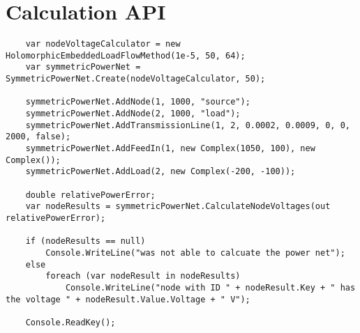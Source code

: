 \chapter{Calculation API}
\label{chap:calculation_api}

\begin{lstlisting}
	var nodeVoltageCalculator = new HolomorphicEmbeddedLoadFlowMethod(1e-5, 50, 64);
	var symmetricPowerNet = SymmetricPowerNet.Create(nodeVoltageCalculator, 50);

	symmetricPowerNet.AddNode(1, 1000, "source");
	symmetricPowerNet.AddNode(2, 1000, "load");
	symmetricPowerNet.AddTransmissionLine(1, 2, 0.0002, 0.0009, 0, 0, 2000, false);
	symmetricPowerNet.AddFeedIn(1, new Complex(1050, 100), new Complex());
	symmetricPowerNet.AddLoad(2, new Complex(-200, -100));

	double relativePowerError;
	var nodeResults = symmetricPowerNet.CalculateNodeVoltages(out relativePowerError);

	if (nodeResults == null)
		Console.WriteLine("was not able to calcuate the power net");
	else
		foreach (var nodeResult in nodeResults)
			Console.WriteLine("node with ID " + nodeResult.Key + " has the voltage " + nodeResult.Value.Voltage + " V");

	Console.ReadKey();
\end{lstlisting}